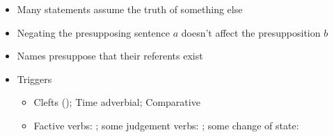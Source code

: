 \documentclass[headrule,footrule]{foils}
\begin{document}
\begin{itemize}
\item Many statements assume the truth of something else
  \begin{exe}
    \ex   \begin{xlist}
    \ex {} %
    \ex {} %
    \end{xlist}
  \end{exe}
\item Negating the presupposing sentence $a$ doesn't affect the presupposition $b$
\item Names presuppose that their referents exist
\item Triggers 
  \begin{itemize}
  \item Clefts (); Time adverbial; Comparative
  \item Factive verbs: ; 
    some judgement verbs: ; 
    some change of state: 
    \end{itemize}
\end{itemize}






\end{document}
